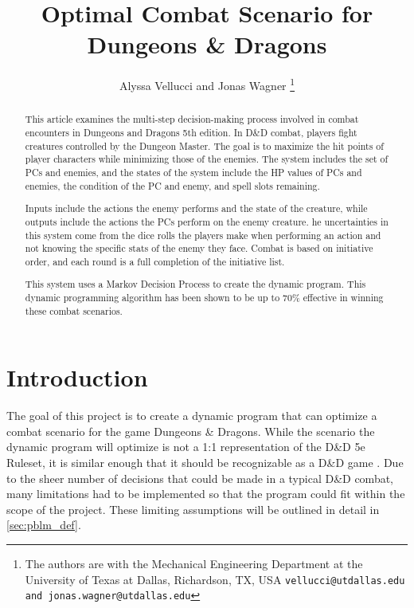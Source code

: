 \documentclass[letterpaper, 10 pt, conference]{ieeeconf}
\title{
    \LARGE \bf
    Optimal Combat Scenario for Dungeons \& Dragons
}
\author{
    Alyssa Vellucci and Jonas Wagner
    \thanks{
        The authors are with the Mechanical Engineering Department at the University of Texas at Dallas, Richardson, TX, USA 
    {\tt\small vellucci@utdallas.edu and jonas.wagner@utdallas.edu}
    }
}
\begin{document}
\maketitle
\begin{abstract}

    This article examines the multi-step decision-making process involved in combat encounters in Dungeons and Dragons 5th edition. 
    In D\&D combat, players fight creatures controlled by the Dungeon Master. 
    The goal is to maximize the hit points of player characters while minimizing those of the enemies. 
    The system includes the set of PCs and enemies, and the states of the system include the HP values of PCs and enemies, the condition of the PC and enemy, and spell slots remaining.

    Inputs include the actions the enemy performs and the state of the creature, while outputs include the actions the PCs perform on the enemy creature. 
    he uncertainties in this system come from the dice rolls the players make when performing an action and not knowing the specific stats of the enemy they face. 
    Combat is based on initiative order, and each round is a full completion of the initiative list.

    This system uses a Markov Decision Process to create the dynamic program.  
    This dynamic programming algorithm has been shown to be up to 70\% effective in winning these combat scenarios.


\end{abstract}


\section{Introduction}
The goal of this project is to create a dynamic program that can optimize a combat scenario for the game Dungeons \& Dragons. 
While the scenario the dynamic program will 
optimize is not a 1:1 representation of the D\&D 5e Ruleset, it is similar enough that it should be recognizable as a D\&D game \cite{dnd_wizards, dnd_beyond, dnd_wiki}.
Due to the sheer number of decisions that could be made in a typical D\&D combat, many limitations had to be implemented so that the program could fit within the scope of the project. 
These limiting assumptions will be outlined
in detail in \autoref{sec:pblm_def}. 
\end{document}
